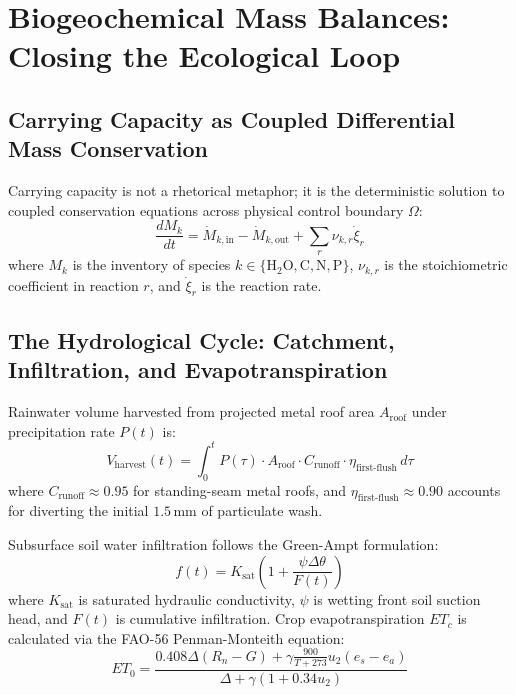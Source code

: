 \section{Biogeochemical Mass Balances: Closing the Ecological Loop}
\label{sec:l1_biogeochemical}

\subsection{Carrying Capacity as Coupled Differential Mass Conservation}

Carrying capacity is not a rhetorical metaphor; it is the deterministic solution to coupled conservation equations across physical control boundary $\Omega$:
\begin{equation}
\frac{d M_k}{dt} = \dot{M}_{k,\mathrm{in}} - \dot{M}_{k,\mathrm{out}} + \sum_r \nu_{k,r} \dot{\xi}_r
\label{eq:mass_balance}
\end{equation}
where $M_k$ is the inventory of species $k \in \{ \mathrm{H_2O}, \mathrm{C}, \mathrm{N}, \mathrm{P} \}$, $\nu_{k,r}$ is the stoichiometric coefficient in reaction $r$, and $\dot{\xi}_r$ is the reaction rate.

\subsection{The Hydrological Cycle: Catchment, Infiltration, and Evapotranspiration}

Rainwater volume harvested from projected metal roof area $A_{\mathrm{roof}}$ under precipitation rate $P(t)$ is:
\begin{equation}
V_{\mathrm{harvest}}(t) = \int_0^t P(\tau) \cdot A_{\mathrm{roof}} \cdot C_{\mathrm{runoff}} \cdot \eta_{\mathrm{first\mbox{-}flush}} \, d\tau
\label{eq:rain_harvest}
\end{equation}
where $C_{\mathrm{runoff}} \approx 0.95$ for standing-seam metal roofs, and $\eta_{\mathrm{first\mbox{-}flush}} \approx 0.90$ accounts for diverting the initial $1.5\,\mathrm{mm}$ of particulate wash.

Subsurface soil water infiltration follows the Green-Ampt formulation:
\begin{equation}
f(t) = K_{\mathrm{sat}} \left( 1 + \frac{\psi \Delta \theta}{F(t)} \right)
\label{eq:green_ampt}
\end{equation}
where $K_{\mathrm{sat}}$ is saturated hydraulic conductivity, $\psi$ is wetting front soil suction head, and $F(t)$ is cumulative infiltration. Crop evapotranspiration $ET_c$ is calculated via the FAO-56 Penman-Monteith equation:
\begin{equation}
ET_0 = \frac{0.408 \Delta (R_n - G) + \gamma \frac{900}{T + 273} u_2 (e_s - e_a)}{\Delta + \gamma (1 + 0.34 u_2)}
\label{eq:penman_monteith}
\end{equation}

